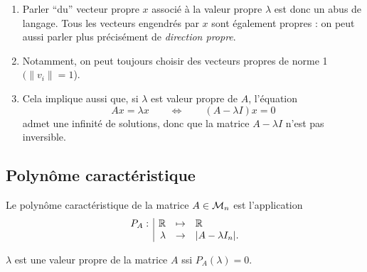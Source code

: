 \remarks
\begin{enumerate}
  \item Parler ``du'' vecteur propre $x$ associé à la valeur propre $\lambda$ est donc un abus de langage. Tous les vecteurs engendrés par $x$ sont également propres : on peut aussi parler plus précisément de {\em direction propre}. 
  \item Notamment, on peut toujours choisir des vecteurs propres de norme 1 $(\|v_i\| = 1$). 
  \item Cela implique aussi que, si $\lambda$ est valeur propre de $A$, l'équation
  $$
  Ax = \lambda x \qquad \Leftrightarrow \qquad (A - \lambda I)x = 0
  $$
  admet une infinité de solutions, donc que la matrice $A - \lambda I$ n'est pas inversible.
\end{enumerate}

\subsection{Polynôme caractéristique} \label{sec:polCarac}

\begin{definition}
  Le polynôme caractéristique de la matrice $A \in \mathcal{M}_n$ est l'application 
  $$
  \begin{array}{r|rcl}
   P_A: & \mathbb{R} & \mapsto & \mathbb{R} \\
    & \lambda & \to & |A - \lambda I_n|.
  \end{array}
  $$
\end{definition}

\bigskip
\begin{theorem}
  $\lambda$ est une valeur propre de la matrice $A$ ssi $P_A(\lambda) = 0$.
\end{theorem}

